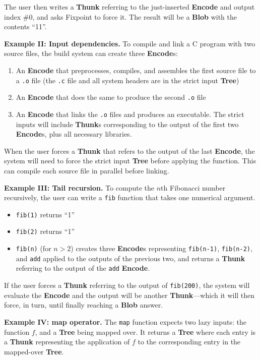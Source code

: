 \documentclass{article}
\newcommand{\blob}{\textbf{Blob}\xspace}
\newcommand{\encode}{\textbf{Encode}\xspace}
\newcommand{\thunk}{\textbf{Thunk}\xspace}
\newcommand{\thunks}{\textbf{Thunk}s\xspace}
\newcommand{\encodes}{\textbf{Encode}s\xspace}
\newcommand{\tree}{\textbf{Tree}\xspace}
\begin{document}
The user then writes a \thunk referring to the just-inserted \encode and output index \#0, and asks Fixpoint
to force it. The result will be a \blob with the contents ``11''.

\textbf{Example II: Input dependencies.} To compile and link a C program with two source files,
the build system can create three \encodes:
\begin{enumerate}[itemsep=0pt]
\item An \encode that preprocesses, compiles, and assembles the first source file to a \texttt{.o} file
  (the \texttt{.c} file and all system headers are in the strict input \tree)
\item An \encode that does the same to produce the second \texttt{.o} file
\item An \encode that links the \texttt{.o} files and produces an executable. The strict inputs will include \thunks corresponding to the output of the first two \encodes, plus all necessary libraries.
\end{enumerate}

When the user forces a \thunk that refers to the output of the last \encode, the system will need to force
the strict input \tree before applying the function. This can compile each source file in parallel before linking.

\textbf{Example III: Tail recursion.} To compute the $n$th Fibonacci number
recursively, the user can write a \texttt{fib} function that
takes one numerical argument.
\begin{itemize}[itemsep=0pt]
\item \texttt{fib(1)} returns ``1''
\item \texttt{fib(2)} returns ``1''
  \item \texttt{fib(n)} (for $n>2$) creates three \encodes
    representing \texttt{fib(n-1)}, \texttt{fib(n-2)}, and
    \texttt{add} applied to the outputs of the previous two, and
    returns a \thunk referring to the output of the \texttt{add}
    \encode.
    \end{itemize}

If the user forces a \thunk referring to the output of \texttt{fib(200)}, the system will
evaluate the \encode and the output will be another \thunk---which it will then force, in turn,
until finally reaching a \blob answer.

\textbf{Example IV: map operator.} The \texttt{map} function expects
two lazy inputs: the function $f$, and a \tree being mapped over.  It
returns a \tree where each entry is a \thunk representing the application of $f$ to the corresponding
entry in the mapped-over \tree.
\end{document}

